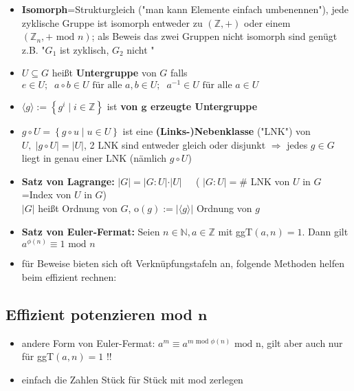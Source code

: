 \documentclass[10pt,a4paper]{article}
\begin{document}
\begin{itemize}
\item \textbf{Isomorph}=Strukturgleich ("man kann Elemente einfach umbenennen"), jede zyklische Gruppe ist isomorph entweder zu $(\mathbb{Z},+)$ oder einem $(\mathbb{Z}_{n},+ \text{ mod } n)$; als Beweis das zwei Gruppen nicht isomorph sind genügt z.B. "$G_{1}$ ist zyklisch, $G_{2}$ nicht "
\item $U\subseteq G$ heißt \textbf{Untergruppe} von $G$ falls $e\in U;\;\; a\circ b \in U \text { für alle } a,b\in U;\;\; a^{-1} \in U \text{ für alle } a \in U$ 
\item $\langle g \rangle:=\left\lbrace g^{i}\mid i \in \mathbb{Z}\right\rbrace$ ist \textbf{von $\boldsymbol{g}$ erzeugte Untergruppe}
\item $g \circ U=\left\lbrace g\circ u \mid u \in U \right\rbrace$ ist eine \textbf{(Links-)Nebenklasse} ("LNK") von $U,\; \vert g\circ U\vert =\vert U\vert$, 2 LNK sind entweder gleich oder disjunkt $\Rightarrow$ jedes $g\in G$ liegt in genau einer LNK (nämlich $g\circ U$)
\item \textbf{Satz von Lagrange:} $\vert G \vert = \vert G : U \vert \cdot \vert U \vert\;\;\;\;$  ( $\vert G : U \vert=\#$ LNK von $U$ in $G$=Index von $U$ in $G$)\\ $\vert G \vert$ heißt Ordnung von $G$, o$(g):=\vert \langle g\rangle \vert$ Ordnung von $g$
\item \textbf{Satz von Euler-Fermat:} Seien $n\in \mathbb{N}, a\in \mathbb{Z}$ mit ggT$(a,n)=1$. Dann gilt $a^{\phi(n)}\equiv 1 \text{ mod } n$
\item für Beweise bieten sich oft Verknüpfungstafeln an, folgende Methoden helfen beim effizient rechnen:
\end{itemize}



\subsection{Effizient potenzieren mod $\boldsymbol{n}$}
\begin{itemize}


\item andere Form von Euler-Fermat: $a^{m} \equiv a^{m \text { mod } \phi (n)} \text{ mod n}$, gilt aber auch nur für ggT$(a,n)=1$ !!
\item einfach die Zahlen Stück für Stück mit mod zerlegen
\end{itemize}
\end{document}
